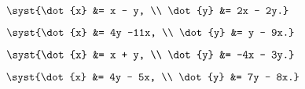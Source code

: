 \begin{multicols}{4}
\begin{enumtasks}
			\item \( \syst{\dot{x} &= x - y, \\ \dot{y} &= 2x - 2y.} \) %
			\item \( \syst{\dot{x} &= 4y -11x, \\ \dot{y} &= y - 9x.} \) %
			\item \( \syst{\dot{x} &= x + y, \\ \dot{y} &= -4x - 3y.} \) %
			\item \( \syst{\dot{x} &= 4y - 5x, \\ \dot{y} &= 7y - 8x.} \) %

\end{enumtasks}
\end{multicols}
